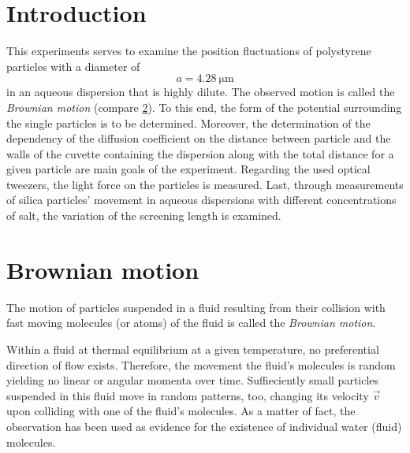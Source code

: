 \documentclass[.../bericht]{subfilies}
\begin{document}
  \section{Introduction}

    This experiments serves to examine the position fluctuations of polystyrene particles with a diameter of
    \begin{equation*}
      a=\SI{4,28}{\micro\meter}
    \end{equation*}
    in an aqueous dispersion that is highly dilute. The observed motion is called the \textit{Brownian motion} (compare \cref{sec:brownian-motion}). To this end, the form of the potential surrounding the single particles is to be determined. Moreover, the determination of the dependency of the diffusion coefficient on the distance between particle and the walls of the cuvette containing the dispersion along with the total distance for a given particle are main goals of the experiment. Regarding the used optical tweezers, the light force on the particles is measured. Last, through measurements of silica particles' movement in aqueous dispersions with different concentrations of salt, the variation of the screening length is examined.


    \section{Brownian motion}
    \label{sec:brownian-motion}

      The motion of particles suspended in a fluid resulting from their collision with fast moving molecules (or atoms) of the fluid is called the \textit{Brownian motion}.

      Within a fluid at thermal equilibrium at a given temperature, no preferential direction of flow exists. Therefore, the movement the fluid's molecules is random yielding no linear or angular momenta over time. Suffieciently small particles suspended in this fluid move in random patterns, too, changing its velocity $\vec{v}$ upon colliding with one of the fluid's molecules. As a matter of fact, the observation has been used as evidence for the existence of individual water (fluid) molecules.
\end{document}
